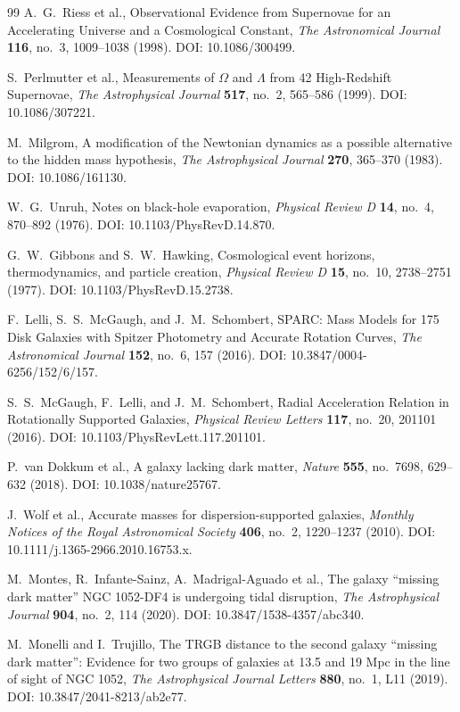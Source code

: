 \documentclass[11pt,a4paper]{article}
\theoremstyle{definition}
\begin{document}
\begin{thebibliography}{99}
A.~G.~Riess et al., Observational Evidence from Supernovae for an Accelerating Universe and a Cosmological Constant, \textit{The Astronomical Journal} \textbf{116}, no.~3, 1009--1038 (1998). DOI: 10.1086/300499.

S.~Perlmutter et al., Measurements of $\Omega$ and $\Lambda$ from 42 High-Redshift Supernovae, \textit{The Astrophysical Journal} \textbf{517}, no.~2, 565--586 (1999). DOI: 10.1086/307221.

M.~Milgrom, A modification of the Newtonian dynamics as a possible alternative to the hidden mass hypothesis, \textit{The Astrophysical Journal} \textbf{270}, 365--370 (1983). DOI: 10.1086/161130.

W.~G.~Unruh, Notes on black-hole evaporation, \textit{Physical Review D} \textbf{14}, no.~4, 870--892 (1976). DOI: 10.1103/PhysRevD.14.870.

G.~W.~Gibbons and S.~W.~Hawking, Cosmological event horizons, thermodynamics, and particle creation, \textit{Physical Review D} \textbf{15}, no.~10, 2738--2751 (1977). DOI: 10.1103/PhysRevD.15.2738.

F.~Lelli, S.~S.~McGaugh, and J.~M.~Schombert, SPARC: Mass Models for 175 Disk Galaxies with Spitzer Photometry and Accurate Rotation Curves, \textit{The Astronomical Journal} \textbf{152}, no.~6, 157 (2016). DOI: 10.3847/0004-6256/152/6/157.

S.~S.~McGaugh, F.~Lelli, and J.~M.~Schombert, Radial Acceleration Relation in Rotationally Supported Galaxies, \textit{Physical Review Letters} \textbf{117}, no.~20, 201101 (2016). DOI: 10.1103/PhysRevLett.117.201101.

P.~van Dokkum et al., A galaxy lacking dark matter, \textit{Nature} \textbf{555}, no.~7698, 629--632 (2018). DOI: 10.1038/nature25767.

J.~Wolf et al., Accurate masses for dispersion-supported galaxies, \textit{Monthly Notices of the Royal Astronomical Society} \textbf{406}, no.~2, 1220--1237 (2010). DOI: 10.1111/j.1365-2966.2010.16753.x.

M.~Montes, R.~Infante-Sainz, A.~Madrigal-Aguado et al., The galaxy ``missing dark matter'' NGC 1052-DF4 is undergoing tidal disruption, \textit{The Astrophysical Journal} \textbf{904}, no.~2, 114 (2020). DOI: 10.3847/1538-4357/abc340.

M.~Monelli and I.~Trujillo, The TRGB distance to the second galaxy ``missing dark matter'': Evidence for two groups of galaxies at 13.5 and 19 Mpc in the line of sight of NGC 1052, \textit{The Astrophysical Journal Letters} \textbf{880}, no.~1, L11 (2019). DOI: 10.3847/2041-8213/ab2e77.


\end{thebibliography}
\end{document}
